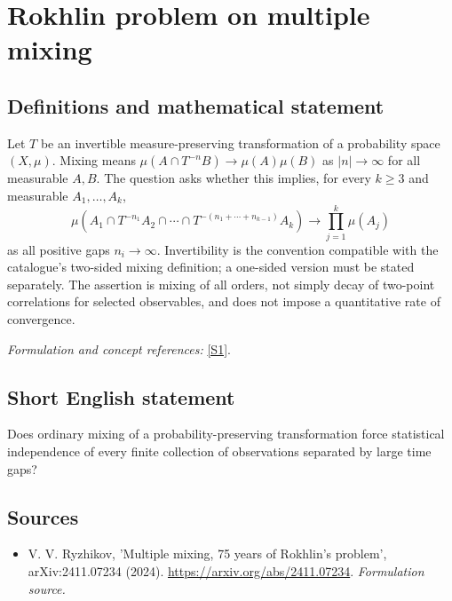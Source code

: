 \documentclass[11pt]{article}
\begin{document}
\section*{\texorpdfstring{Rokhlin problem on multiple mixing}{Rokhlin problem on multiple mixing}}\label{30006903}
\subsection{Definitions and mathematical statement}
Let $T$ be an invertible measure-preserving transformation of a probability space $(X,\mu)$. Mixing means $\mu(A\cap T^{-n}B)\to\mu(A)\mu(B)$ as $|n|\to\infty$ for all measurable $A,B$. The question asks whether this implies, for every $k\ge3$ and measurable $A_1,\ldots,A_k$,
\[
 \mu\!\left(A_1\cap T^{-n_1}A_2\cap\cdots\cap
 T^{-(n_1+\cdots+n_{k-1})}A_k\right)
 \longrightarrow\prod_{j=1}^k\mu(A_j)
\]
as all positive gaps $n_i\to\infty$. Invertibility is the convention compatible with the catalogue's two-sided mixing definition; a one-sided version must be stated separately. The assertion is mixing of all orders, not simply decay of two-point correlations for selected observables, and does not impose a quantitative rate of convergence.
\par\smallskip\textit{Formulation and concept references:} \href{https://arxiv.org/abs/2411.07234}{[S1]}.

\subsection{Short English statement}
Does ordinary mixing of a probability-preserving transformation force statistical independence of every finite collection of observations separated by large time gaps?
\subsection{Sources}
\begin{itemize}
\item[S1]V. V. Ryzhikov, 'Multiple mixing, 75 years of Rokhlin's problem', arXiv:2411.07234 (2024).
\url{https://arxiv.org/abs/2411.07234}.
\textit{Formulation source.}
\end{itemize}
\end{document}
